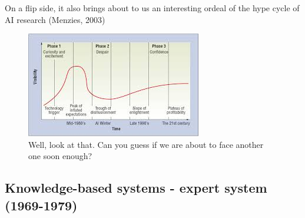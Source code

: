 On a flip side, it also brings about to us an interesting ordeal of the hype cycle of AI research (Menzies, 2003)
\begin{figure}[h!]
    \centering
    \includegraphics{img/image.png}
    \caption{Well, look at that. Can you guess if we are about to face another one soon enough?}
\end{figure}

\subsection{Knowledge-based systems - expert system (1969-1979)}

